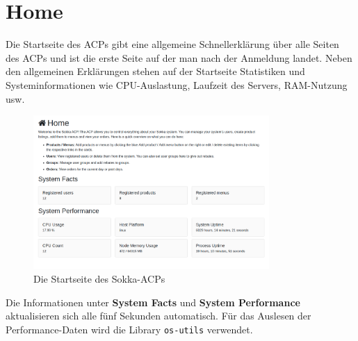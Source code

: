 \section{Home}

Die Startseite des ACPs gibt eine allgemeine Schnellerklärung über alle Seiten des ACPs und ist die erste Seite auf der man nach der Anmeldung landet. Neben den allgemeinen Erklärungen stehen auf der Startseite Statistiken und Systeminformationen wie CPU-Auslastung, Laufzeit des Servers, RAM-Nutzung usw.

\begin{figure}[ht]
    \centering
    \includegraphics[width=0.8\textwidth]{images/ACP/home.png}
    \caption{Die Startseite des Sokka-ACPs}
\end{figure}

Die Informationen unter \textbf{System Facts} und \textbf{System Performance} aktualisieren sich alle fünf Sekunden automatisch. Für das Auslesen der Performance-Daten wird die Library \lstinline{os-utils} verwendet.
